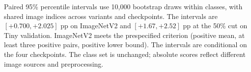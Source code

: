 

Paired 95\% percentile intervals use 10,000 bootstrap draws within
classes, with shared image indices across variants and checkpoints. The
intervals are $[+0.700,+2.025]$ pp on ImageNetV2 and $[+1.67,+2.52]$ pp at
the 50\% cut on Tiny validation. ImageNetV2 meets the prespecified
criterion (positive mean, at least three positive pairs, positive lower
bound). The intervals are conditional on the four checkpoints. The class
set is unchanged; absolute scores reflect different image sources and
preprocessing.
\FloatBarrier
